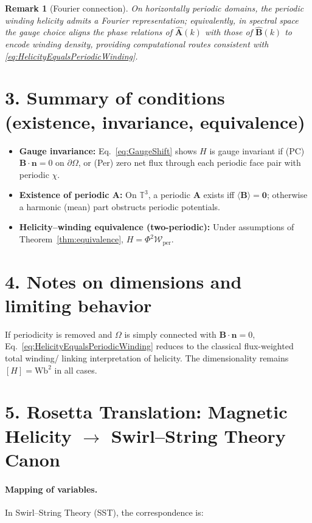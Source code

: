 \documentclass[11pt]{article}
\newtheorem{remark}{Remark}
\newcommand{\bbT}{\mathbb{T}}
\newcommand{\mean}[1]{\langle #1\rangle}
\begin{document}
\begin{remark}[Fourier connection]
On horizontally periodic domains, the periodic winding helicity admits a Fourier representation; equivalently, in spectral space the gauge choice aligns the phase relations of $\widehat{\bm{A}}(k)$ with those of $\widehat{\bm{B}}(k)$ to encode winding density, providing computational routes consistent with \eqref{eq:HelicityEqualsPeriodicWinding}.
\end{remark}

\section*{3. Summary of conditions (existence, invariance, equivalence)}
\begin{itemize}
\item \textbf{Gauge invariance:} Eq.~\eqref{eq:GaugeShift} shows $H$ is gauge invariant if (PC) $\bm{B}\!\cdot\!\bm{n}=0$ on $\partial\Omega$, or (Per) zero net flux through each periodic face pair with periodic $\chi$.
\item \textbf{Existence of periodic $\bm{A}$:} On $\bbT^3$, a periodic $\bm{A}$ exists iff $\mean{\bm{B}}=\bm{0}$; otherwise a harmonic (mean) part obstructs periodic potentials.
\item \textbf{Helicity--winding equivalence (two-periodic):} Under assumptions of Theorem~\ref{thm:equivalence}, $H=\Phi^2\mathcal{W}_{\mathrm{per}}$.
\end{itemize}

\section*{4. Notes on dimensions and limiting behavior}
If periodicity is removed and $\Omega$ is simply connected with $\bm{B}\!\cdot\!\bm{n}=0$, Eq.~\eqref{eq:HelicityEqualsPeriodicWinding} reduces to the classical flux-weighted total winding/ linking interpretation of helicity. The dimensionality remains $[H]=\mathrm{Wb^2}$ in all cases.

\section*{5. Rosetta Translation: Magnetic Helicity $\to$ Swirl--String Theory Canon}

\paragraph{Mapping of variables.}
    In Swirl--String Theory (SST), the correspondence is:
\end{document}
